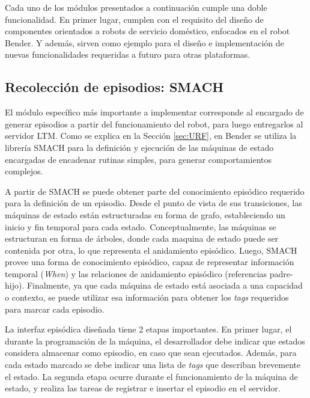 Cada uno de los módulos presentados a continuación cumple una doble funcionalidad. En primer lugar, cumplen con el requisito del diseño de componentes orientados a robots de servicio doméstico, enfocados en el robot Bender. Y además, sirven como ejemplo para el diseño e implementación de nuevas funcionalidades requeridas a futuro para otras plataformas.

\subsection{Recolección de episodios: SMACH}

El módulo específico más importante a implementar corresponde al encargado de generar episodios a partir del funcionamiento del robot, para luego entregarlos al servidor LTM. Como se explica en la Sección \ref{sec:URF}, en Bender se utiliza la librería SMACH para la definición y ejecución de las máquinas de estado encargadas de encadenar rutinas simples, para generar comportamientos complejos.

A partir de SMACH se puede obtener parte del conocimiento episódico requerido para la definición de un episodio. Desde el punto de vista de sus transiciones, las máquinas de estado están estructuradas en forma de grafo, estableciendo un inicio y fin temporal para cada estado. Conceptualmente, las máquinas se estructuran en forma de árboles, donde cada maquina de estado puede ser contenida por otra, lo que representa el anidamiento episódico. Luego, SMACH provee una forma de conocimiento episódico, capaz de representar información temporal (\textit{When}) y las relaciones de anidamiento episódico (referencias padre-hijo). Finalmente, ya que cada máquina de estado está asociada a una capacidad o contexto, se puede utilizar esa información para obtener los \textit{tags} requeridos para marcar cada episodio.

La interfaz episódica diseñada tiene 2 etapas importantes. En primer lugar, el durante la programación de la máquina, el desarrollador debe indicar que estados considera almacenar como episodio, en caso que sean ejecutados. Además, para cada estado marcado se debe indicar una lista de \textit{tags} que describan brevemente el estado. La segunda etapa ocurre durante el funcionamiento de la máquina de estado, y realiza las tareas de registrar e insertar el episodio en el servidor.

